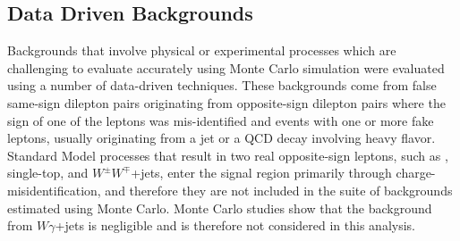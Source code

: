 \subsection{Data Driven Backgrounds}\label{sect:back}

Backgrounds that involve physical or experimental processes which are challenging to evaluate accurately using Monte Carlo simulation were evaluated using a number of data-driven techniques.
These backgrounds come from false same-sign dilepton pairs originating from opposite-sign dilepton pairs where the sign of one of the leptons was mis-identified and events with one or more fake leptons, usually originating from a jet or a QCD decay involving heavy flavor.
Standard Model processes that result in two real opposite-sign leptons, such as \ttbar, single-top, and $W^{\pm}W^{\mp}$+jets, enter the signal region primarily through charge-misidentification, and therefore they are not included in the suite of backgrounds estimated using Monte Carlo.
Monte Carlo studies show that the background from $W\gamma$+jets is negligible and is therefore not considered in this analysis.

